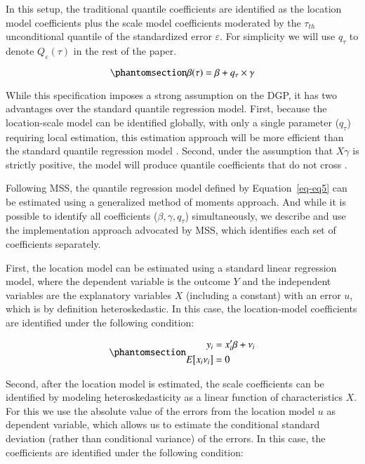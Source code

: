 \documentclass[
  authoryear,
  review,
  1p]{elsarticle}
\begin{document}
In this setup, the traditional quantile coefficients are identified as
the location model coefficients plus the scale model coefficients
moderated by the \(\tau_{th}\) unconditional quantile of the
standardized error \(\varepsilon\). For simplicity we will use
\(q_\tau\) to denote \(Q_\varepsilon(\tau)\) in the rest of the paper.

\begin{equation}\phantomsection\label{eq-eq6}{\beta(\tau) = \beta + q_\tau \times \gamma 
}\end{equation}

While this specification imposes a strong assumption on the DGP, it has
two advantages over the standard quantile regression model. First,
because the location-scale model can be identified globally, with only a
single parameter (\(q_\tau\)) requiring local estimation, this
estimation approach will be more efficient than the standard quantile
regression model \citep{zhao2000}. Second, under the assumption that
\(X\gamma\) is strictly positive, the model will produce quantile
coefficients that do not cross \citep{he1997}.

Following MSS, the quantile regression model defined by
Equation~\ref{eq-eq5} can be estimated using a generalized method of
moments approach. And while it is possible to identify all coefficients
(\(\beta,\gamma, q_\tau\)) simultaneously, we describe and use the
implementation approach advocated by MSS, which identifies each set of
coefficients separately.

First, the location model can be estimated using a standard linear
regression model, where the dependent variable is the outcome \(Y\) and
the independent variables are the explanatory variables \(X\) (including
a constant) with an error \(u\), which is by definition heteroskedastic.
In this case, the location-model coefficients are identified under the
following condition:

\begin{equation}\phantomsection\label{eq-eq7}{\begin{aligned}
      y_i &=x_i'\beta+\nu_i \\
      E\big[ x_i \nu_i\big] &=0
      \end{aligned}
}\end{equation}

Second, after the location model is estimated, the scale coefficients
can be identified by modeling heteroskedasticity as a linear function of
characteristics \(X\). For this we use the absolute value of the errors
from the location model \(u\) as dependent variable, which allows us to
estimate the conditional standard deviation (rather than conditional
variance) of the errors. In this case, the coefficients are identified
under the following condition:
\end{document}
